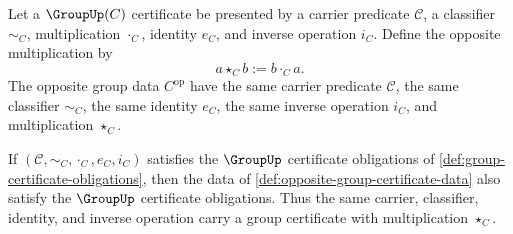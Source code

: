 \begin{definition}
\label{def:opposite-group-certificate-data}
Let a $\GroupUp(C)$ certificate be presented by a carrier predicate $\mathcal C$, a classifier $\sim_C$, multiplication $\cdot_C$, identity $e_C$, and inverse operation $i_C$. Define the opposite multiplication by
$$
a\star_C b:=b\cdot_C a.
$$
The opposite group data $C^{\mathrm{op}}$ have the same carrier predicate $\mathcal C$, the same classifier $\sim_C$, the same identity $e_C$, the same inverse operation $i_C$, and multiplication $\star_C$.
\end{definition}

\begin{theorem}
\label{thm:opposite-group-certificate}
If $(\mathcal C,\sim_C,\cdot_C,e_C,i_C)$ satisfies the $\GroupUp$ certificate obligations of \autoref{def:group-certificate-obligations}, then the data of \autoref{def:opposite-group-certificate-data} also satisfy the $\GroupUp$ certificate obligations. Thus the same carrier, classifier, identity, and inverse operation carry a group certificate with multiplication $\star_C$.
\end{theorem}
